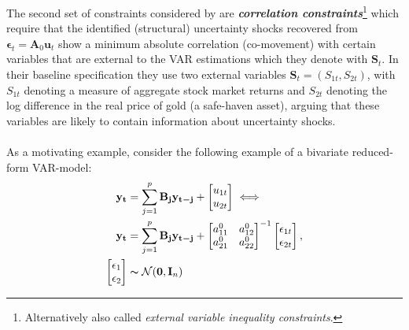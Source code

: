 \documentclass[a4paper,11pt,listof=nochaptergap,oneside,pointednumbers,bibtotoc,bigheadings,liststotoc,hidelinks]{scrbook}
\theoremstyle{mysatz}
\theoremstyle{mydefinition}
\theoremstyle{mytheorem}
\theoremstyle{mybemerkung}
\newcommand{\vect}[1]{\boldsymbol{\mathbf{#1}}}
\begin{document}
The second set of constraints considered by \citet{ludvigsonetal:19} are \textbf{\textit{correlation constraints}}\footnote{Alternatively also called \textit{external variable inequality constraints}.} which require that the identified (structural) uncertainty shocks recovered from $\vect{\epsilon}_t = \vect{A}_0\vect{u}_t$ show a minimum absolute correlation (co-movement) with certain variables that are external to the VAR estimations which they denote with $\vect{S}_t$. In their baseline specification they use two external variables $\vect{S}_t =  (S_{1t}, S_{2t})$, with $S_{1t}$ denoting a measure of aggregate stock market returns and $S_{2t}$ denoting the log difference in the real price of gold (a safe-haven asset), arguing that these variables are likely to contain information about uncertainty shocks.\\
\\
As a motivating example, \citet{ludvigsonetal:17} consider the following example of a bivariate reduced-form VAR-model:
\begin{equation} \label{eq:svar_ludvi12_a}
\begin{split}
	\vect{y_t} & = \sum_{j=1}^{p} \vect{B_j}\vect{y_{t-j}} + 
		\begin{bmatrix}
			u_{1t} \\
			u_{2t}
		\end{bmatrix} \iff \\
\vect{y_t} & = \sum_{j=1}^{p} \vect{B_j}\vect{y_{t-j}} + 	
					\begin{bmatrix}
    			a_{11}^0 &  a_{12}^0 \\
			a_{21}^0 &  a_{22}^0
 			\end{bmatrix}^{-1}
		\begin{bmatrix}
			\epsilon_{1t} \\
			\epsilon_{2t}
		\end{bmatrix},\\
		\begin{bmatrix}
			\epsilon_1 \\
			\epsilon_2
		\end{bmatrix} & \thicksim \mathcal{N}(\vect{0}, \vect{I}_n)
\end{split}								
\end{equation}
\end{document}
